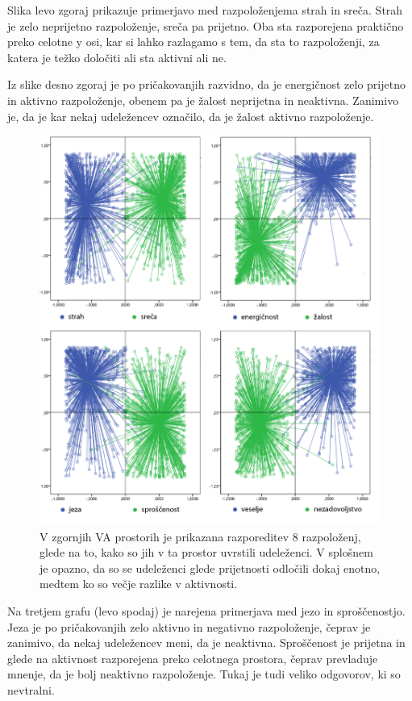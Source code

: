 \documentclass[a4paper, 12pt]{book}
\begin{document}
{Slika levo zgoraj prikazuje primerjavo med razpoloženjema strah in sreča. Strah je zelo neprijetno razpoloženje, sreča pa prijetno. Oba sta razporejena praktično preko celotne y osi, kar si lahko razlagamo s tem, da sta to razpoloženji, za katera je težko določiti ali sta aktivni ali ne. 

Iz slike desno zgoraj je po pričakovanjih razvidno, da je energičnost zelo prijetno in aktivno razpoloženje, obenem pa je žalost neprijetna in neaktivna. Zanimivo je, da je kar nekaj udeležencev označilo, da je žalost aktivno razpoloženje.

\begin{figure}[!hbt]
\centering
\includegraphics[width=12cm]{images/vamoodlables.png}

\caption{V zgornjih VA prostorih je prikazana razporeditev 8 razpoloženj, glede na to, kako so jih v ta prostor uvrstili udeleženci. V splošnem je opazno, da so se udeleženci glede prijetnosti odločili dokaj enotno, medtem ko so večje razlike v aktivnosti.}
\label{moodperception}
\end{figure} 

Na tretjem grafu (levo spodaj) je narejena primerjava med jezo in sproščenostjo. Jeza je po pričakovanjih zelo aktivno in negativno razpoloženje, čeprav je zanimivo, da nekaj udeležencev meni, da je neaktivna. Sproščenost je prijetna in glede na aktivnost razporejena preko celotnega prostora, čeprav prevladuje mnenje, da je bolj neaktivno razpoloženje. Tukaj je tudi veliko odgovorov, ki so nevtralni.

}
\end{document}
